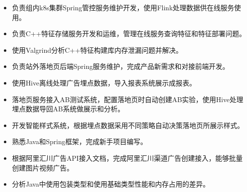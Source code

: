 \documentclass{resume}
\begin{document}

\begin{itemize}
  \item 负责组内k8s集群Spring管控服务维护开发，使用Flink处理数据供在线服务使用。
  \item 负责C++特征存储服务开发和运维，管理在线服务查询特征和特征部署问题。
  \item 使用Valgrind分析C++特征构建库内存泄漏问题并解决。
\end{itemize}

\begin{itemize}
  \item 负责站外落地页后端Spring服务维护，完成产品新需求和对接前端开发。
  \item 使用Hive离线处理广告埋点数据，导入报表系统展示成报表。
  \item 落地页服务接入AB测试系统，配置落地页时自动创建AB实验，使用Hive处理埋点数据导回AB系统做展示和分析。
  \item 开发智能样式系统，根据埋点数据采用不同策略自动决策落地页所展示样式。
\end{itemize}

\begin{itemize}
  \item 熟悉Java和Spring框架，完成新手项目编写。
  \item 根据阿里汇川广告API接入文档，完成阿里汇川渠道广告创建接入，能够批量创建图片视频广告。
  \item 分析Java中使用包装类型和使用基础类型性能和内存占用的差异。
\end{itemize}

\end{document}
